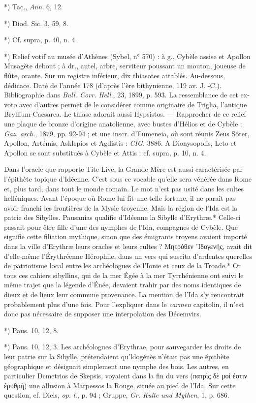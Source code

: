 \documentclass[a4paper, 11pt, oneside, polutonikogreek, french]{article}
\begin{document}
*) Tac., \emph{Ann.} 6, 12.

*) Diod. Sic. 3, 59, 8.

*) Cf. supra, p. 40, n. 4.

*) Relief votif au musée d'Athènes (Sybel, n° 570) : à g., Cybèle assise et Apollon Musagète debout ; à dr., autel, arbre, serviteur poussant un mouton, joueuse de flûte, orante. Sur un registre inférieur, dix thiasotes attablés. Au-dessous, dédicace. Daté de l'année 178 (d'après l'ère bithynienne, 119 av. J. -C.). Bibliographie dans \emph{Bull. Corr. Hell.}, 23, 1899, p. 593. La ressemblance de cet ex-voto avec d'autres permet de le considérer comme originaire de Triglia, l'antique Bryllium-Caesarea. Le thiase adorait aussi Hypsistos. --- Rapprocher de ce relief une plaque de bronze d'origine anatolienne, avec bustes d'Hélios et de Cybèle : \emph{Gaz. arch.}, 1879, pp. 92-94 ; et une inscr. d'Eumeneia, où sont réunis Zeus Sôter, Apollon, Artémis, Asklepios et Agdistis : \emph{CIG.} 3886. A Dionysopolis, Leto et Apollon se sont substitués à Cybèle et Attis : cf. supra, p. 10, n. 4.

Dans l'oracle que rapporte Tite Live, la Grande Mère est aussi caractérisée par l'épithète topique d'Idéenne. C'est sous ce vocable qu'elle sera vénérée dans Rome et, plus tard, dans tout le monde romain. Le mot n'est pas usité dans les cultes helléniques. Avant l'époque où Rome lui fît une telle fortune, il ne paraît pas avoir franchi les frontières de la Mysie troyenne. Mais la région de l'Ida est la patrie des Sibylles. Pausanias qualifie d'Idéenne la Sibylle d'Erythræ.* Celle-ci passait pour être fille d'une des nymphes de l'Ida, compagnes de Cybèle. Que signifie cette filiation mythique, sinon que des émigrants troyens avaient importé dans la ville d'Erythræ leurs oracles et leurs cultes ? Μητρόθεν ᾿Ιδογενής, avait dit d'elle-même l'Érythréenne Hérophile, dans un vers qui suscita d'ardentes querelles de patriotisme local entre les archéologues de l'Ionie et ceux de la Troade.* Or tous ces cahiers sibyllins, qui de la mer Égée à la mer Tyrrhénienne ont suivi le même trajet que la légende d'Énée, devaient trahir par des noms identiques de dieux et de lieux leur commune provenance. La mention de l'Ida s'y rencontrait probablement plus d'une fois. Pour l'expliquer dans le \emph{carmen} capitolin, il n'est donc pas nécessaire de supposer une interpolation des Décemvirs.

*) Paus. 10, 12, 8.

*) Paus. 10, 12, 3. Les archéologues d'Erythrae, pour sauvegarder les droits de leur patrie sur la Sibylle, prétendaient qu'ldogénès n'était pas une épithète géographique et désignait simplement une nymphe des bois. Les autres, en particulier Dcmetrios de Skepsis, voyaient dans la fin du vers (πατρὶς δὲ μοί ἐστιν ἐρυθρὴ) une allusion à Marpessos la Rouge, située au pied de l'Ida. Sur cette question, cf. Diels, \emph{op. l.}, p. 94 ; Gruppe, \emph{Gr. Kulte und Mythen}, 1, p. 686.
\end{document}
